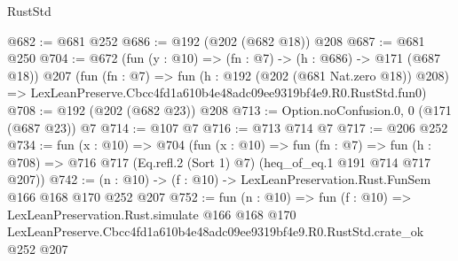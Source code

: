 \begin{lexlean}{RustStd}
\begin{coremodule}
@682 := @681 @252
@686 := @192 (@202 (@682 @18)) @208
@687 := @681 @250
@704 := @672
    (fun (y : @10) => (fn : @7) -> (h : @686) -> @171 (@687 @18))
    @207
    (fun (fn : @7) =>
    fun (h : @192 (@202 (@681 Nat.zero @18)) @208) =>
    LexLeanPreserve.Cbcc4fd1a610b4e48adc09ee9319bf4e9.R0.RustStd.fun0)
@708 := @192 (@202 (@682 @23)) @208
@713 := Option.noConfusion.{0, 0} (@171 (@687 @23)) @7
@714 := @107 @7
@716 := @713 @714 @7
@717 := @206 @252
@734 := fun (x : @10) =>
  @704
    (fun (x : @10) =>
    fun (fn : @7) =>
    fun (h : @708) => @716 @717 (Eq.refl.{2} (Sort 1) @7) (heq_of_eq.{1} @191 @714 @717 @207))
@742 := (n : @10) -> (f : @10) -> LexLeanPreservation.Rust.FunSem @166 @168 @170 @252 @207
@752 := fun (n : @10) =>
  fun (f : @10) =>
  LexLeanPreservation.Rust.simulate
    @166
    @168
    @170
    LexLeanPreserve.Cbcc4fd1a610b4e48adc09ee9319bf4e9.R0.RustStd.crate_ok
    @252
    @207
\end{coremodule}
\end{lexlean}

